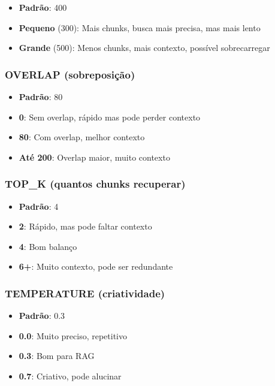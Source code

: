 \documentclass[12pt,a4paper]{article}
\begin{document}
\begin{itemize}
    \item \textbf{Padrão}: 400
    \item \textbf{Pequeno} (300): Mais chunks, busca mais precisa, mas mais lento
    \item \textbf{Grande} (500): Menos chunks, mais contexto, possível sobrecarregar
\end{itemize}

\subsubsection{OVERLAP (sobreposição)}

\begin{itemize}
    \item \textbf{Padrão}: 80
    \item \textbf{0}: Sem overlap, rápido mas pode perder contexto
    \item \textbf{80}: Com overlap, melhor contexto
    \item \textbf{Até 200}: Overlap maior, muito contexto
\end{itemize}

\subsubsection{TOP\_K (quantos chunks recuperar)}

\begin{itemize}
    \item \textbf{Padrão}: 4
    \item \textbf{2}: Rápido, mas pode faltar contexto
    \item \textbf{4}: Bom balanço
    \item \textbf{6+}: Muito contexto, pode ser redundante
\end{itemize}

\subsubsection{TEMPERATURE (criatividade)}

\begin{itemize}
    \item \textbf{Padrão}: 0.3
    \item \textbf{0.0}: Muito preciso, repetitivo
    \item \textbf{0.3}: Bom para RAG
    \item \textbf{0.7}: Criativo, pode alucinar
\end{itemize}
\end{document}
